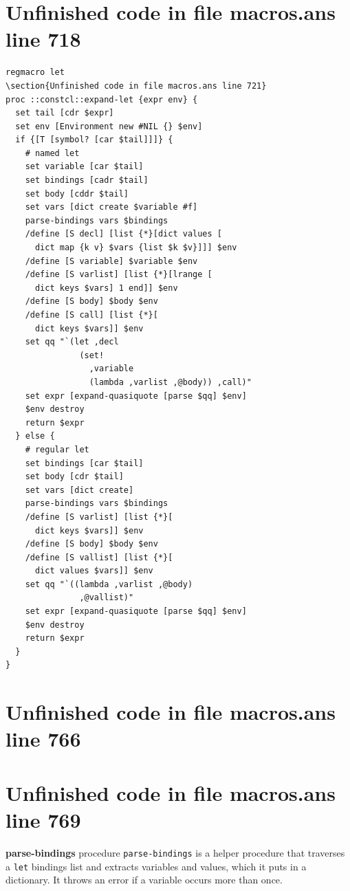 \documentclass[twoside,9pt]{report}
\begin{document}
\section{Unfinished code in file macros.ans line 718}
\begin{lstlisting}
regmacro let
\section{Unfinished code in file macros.ans line 721}
proc ::constcl::expand-let {expr env} {
  set tail [cdr $expr]
  set env [Environment new #NIL {} $env]
  if {[T [symbol? [car $tail]]]} {
    # named let
    set variable [car $tail]
    set bindings [cadr $tail]
    set body [cddr $tail]
    set vars [dict create $variable #f]
    parse-bindings vars $bindings
    /define [S decl] [list {*}[dict values [
      dict map {k v} $vars {list $k $v}]]] $env
    /define [S variable] $variable $env
    /define [S varlist] [list {*}[lrange [
      dict keys $vars] 1 end]] $env
    /define [S body] $body $env
    /define [S call] [list {*}[
      dict keys $vars]] $env
    set qq "`(let ,decl
               (set!
                 ,variable
                 (lambda ,varlist ,@body)) ,call)"
    set expr [expand-quasiquote [parse $qq] $env]
    $env destroy
    return $expr
  } else {
    # regular let
    set bindings [car $tail]
    set body [cdr $tail]
    set vars [dict create]
    parse-bindings vars $bindings
    /define [S varlist] [list {*}[
      dict keys $vars]] $env
    /define [S body] $body $env
    /define [S vallist] [list {*}[
      dict values $vars]] $env
    set qq "`((lambda ,varlist ,@body)
               ,@vallist)"
    set expr [expand-quasiquote [parse $qq] $env]
    $env destroy
    return $expr
  }
}
\end{lstlisting}
\section{Unfinished code in file macros.ans line 766}

\section{Unfinished code in file macros.ans line 769}

\textbf{parse-bindings} procedure \texttt{parse-bindings} is a helper procedure that traverses a \texttt{let} bindings list and extracts variables and values, which it puts in a dictionary. It throws an error if a variable occurs more than once.
\end{document}
